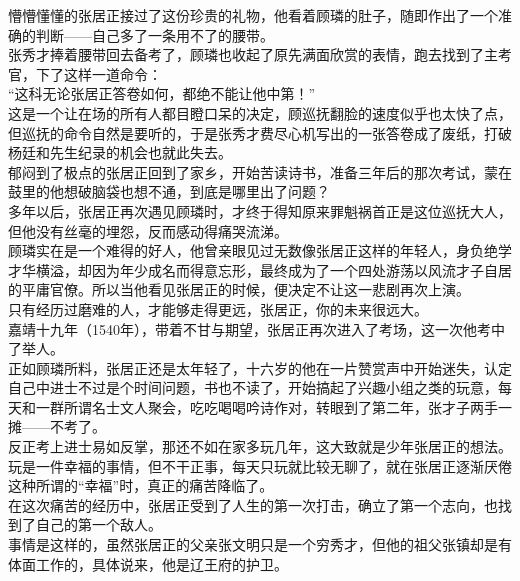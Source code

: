\begin{multicols}{\theparacolNo}
懵懵懂懂的张居正接过了这份珍贵的礼物，他看着顾璘的肚子，随即作出了一个准确的判断——自己多了一条用不了的腰带。\\

张秀才捧着腰带回去备考了，顾璘也收起了原先满面欣赏的表情，跑去找到了主考官，下了这样一道命令：\\

“这科无论张居正答卷如何，都绝不能让他中第！”\\

这是一个让在场的所有人都目瞪口呆的决定，顾巡抚翻脸的速度似乎也太快了点，但巡抚的命令自然是要听的，于是张秀才费尽心机写出的一张答卷成了废纸，打破杨廷和先生纪录的机会也就此失去。\\

郁闷到了极点的张居正回到了家乡，开始苦读诗书，准备三年后的那次考试，蒙在鼓里的他想破脑袋也想不通，到底是哪里出了问题？\\

多年以后，张居正再次遇见顾璘时，才终于得知原来罪魁祸首正是这位巡抚大人，但他没有丝毫的埋怨，反而感动得痛哭流涕。\\

顾璘实在是一个难得的好人，他曾亲眼见过无数像张居正这样的年轻人，身负绝学才华横溢，却因为年少成名而得意忘形，最终成为了一个四处游荡以风流才子自居的平庸官僚。所以当他看见张居正的时候，便决定不让这一悲剧再次上演。\\

只有经历过磨难的人，才能够走得更远，张居正，你的未来很远大。\\

嘉靖十九年（1540年），带着不甘与期望，张居正再次进入了考场，这一次他考中了举人。\\

正如顾璘所料，张居正还是太年轻了，十六岁的他在一片赞赏声中开始迷失，认定自己中进士不过是个时间问题，书也不读了，开始搞起了兴趣小组之类的玩意，每天和一群所谓名士文人聚会，吃吃喝喝吟诗作对，转眼到了第二年，张才子两手一摊——不考了。\\

反正考上进士易如反掌，那还不如在家多玩几年，这大致就是少年张居正的想法。\\

玩是一件幸福的事情，但不干正事，每天只玩就比较无聊了，就在张居正逐渐厌倦这种所谓的“幸福”时，真正的痛苦降临了。\\

在这次痛苦的经历中，张居正受到了人生的第一次打击，确立了第一个志向，也找到了自己的第一个敌人。\\

事情是这样的，虽然张居正的父亲张文明只是一个穷秀才，但他的祖父张镇却是有体面工作的，具体说来，他是辽王府的护卫。\\


\end{multicols}
